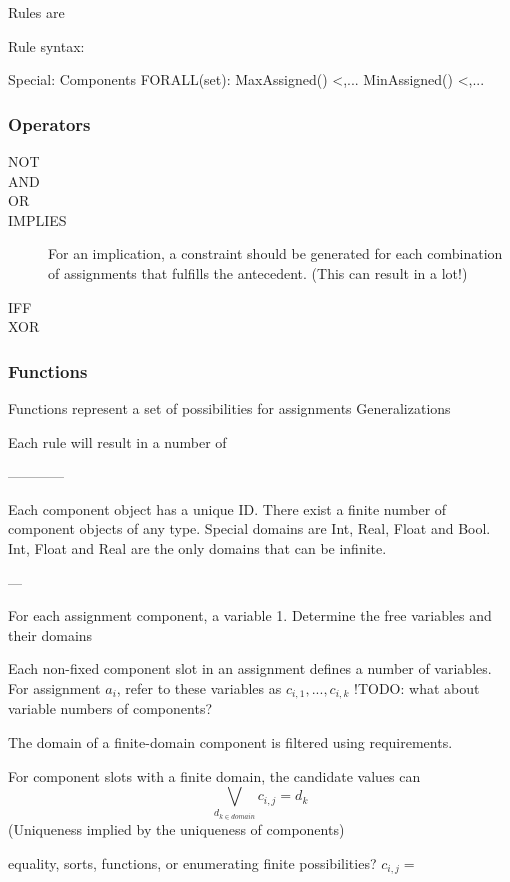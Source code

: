 Rules are

Rule syntax:

Special:
Components
FORALL(set):
MaxAssigned() <,...
MinAssigned() <,...


\subsubsection{Operators}
\begin{description}
	\item[NOT]
	\item[AND]
	\item[OR]
	\item[IMPLIES]
	For an implication, a constraint should be generated for each combination of assignments that fulfills the antecedent.
	(This can result in a lot!)
	\item[IFF]
	\item[XOR]
\end{description}

\subsubsection{Functions}

Functions represent a set of possibilities for assignments
Generalizations

Each rule will result in a number of





------------

Each component object has a unique ID. There exist a finite number of component objects of any type.
Special domains are Int, Real, Float and Bool. Int, Float and Real are the only domains that can be infinite.

---

For each assignment component, a variable
1. Determine the free variables and their domains

Each non-fixed component slot in an assignment defines a number of variables. For assignment $a_i$, refer to these variables as $c_{i,1},...,c_{i,k}$
!TODO: what about variable numbers of components?

The domain of a finite-domain component is filtered using requirements.

For component slots with a finite domain, the candidate values can 
$$\bigvee_{d_{k\in domain}} c_{i,j} = d_k$$
(Uniqueness implied by the uniqueness of components)

equality, sorts, functions, or enumerating finite possibilities?
$c_{i,j} = $

